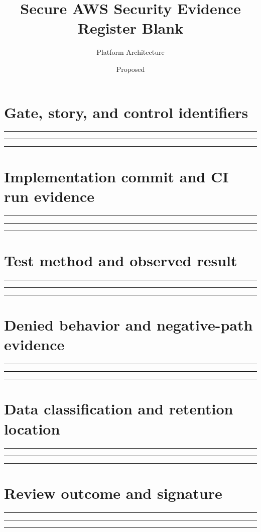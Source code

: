 \documentclass[11pt,letterpaper]{article}
\title{Secure AWS Security Evidence Register Blank}
\author{Platform Architecture}
\date{Proposed}
\newcommand{\WritingLines}{\par\vspace{5mm}\noindent\rule{\linewidth}{0.3pt}\par\vspace{5mm}\noindent\rule{\linewidth}{0.3pt}\par\vspace{5mm}\noindent\rule{\linewidth}{0.3pt}\par}
\begin{document}
\maketitle
\section{Gate, story, and control identifiers}
\WritingLines
\section{Implementation commit and CI run evidence}
\WritingLines
\section{Test method and observed result}
\WritingLines
\section{Denied behavior and negative-path evidence}
\WritingLines
\section{Data classification and retention location}
\WritingLines
\section{Review outcome and signature}
\WritingLines
\end{document}
